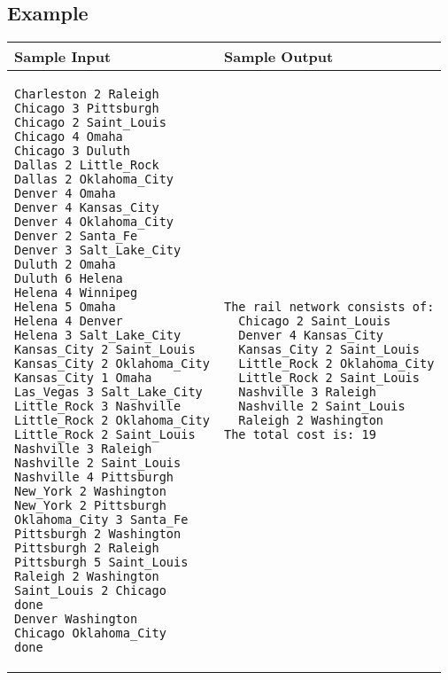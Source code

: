 \documentclass[12pt,pdftex]{article}
\begin{document}
\subsection*{Example}

\begin{tabular}{l|l}
{\bf Sample Input } & {\bf Sample Output} \\
\hline
\begin{minipage}[t]{0.5\linewidth}
\vspace*{0.5ex}
\begin{verbatim}
Charleston 2 Raleigh
Chicago 3 Pittsburgh
Chicago 2 Saint_Louis
Chicago 4 Omaha
Chicago 3 Duluth
Dallas 2 Little_Rock
Dallas 2 Oklahoma_City
Denver 4 Omaha
Denver 4 Kansas_City
Denver 4 Oklahoma_City
Denver 2 Santa_Fe
Denver 3 Salt_Lake_City
Duluth 2 Omaha
Duluth 6 Helena
Helena 4 Winnipeg
Helena 5 Omaha
Helena 4 Denver
Helena 3 Salt_Lake_City
Kansas_City 2 Saint_Louis
Kansas_City 2 Oklahoma_City
Kansas_City 1 Omaha
Las_Vegas 3 Salt_Lake_City
Little_Rock 3 Nashville
Little_Rock 2 Oklahoma_City
Little_Rock 2 Saint_Louis
Nashville 3 Raleigh
Nashville 2 Saint_Louis
Nashville 4 Pittsburgh
New_York 2 Washington
New_York 2 Pittsburgh
Oklahoma_City 3 Santa_Fe
Pittsburgh 2 Washington
Pittsburgh 2 Raleigh
Pittsburgh 5 Saint_Louis
Raleigh 2 Washington
Saint_Louis 2 Chicago
done
Denver Washington
Chicago Oklahoma_City
done
\end{verbatim}
\vspace*{0.5ex}
\end{minipage} &
\begin{minipage}[t]{0.4\linewidth}
\vspace*{0.5ex}
\begin{verbatim}
The rail network consists of:
  Chicago 2 Saint_Louis
  Denver 4 Kansas_City
  Kansas_City 2 Saint_Louis
  Little_Rock 2 Oklahoma_City
  Little_Rock 2 Saint_Louis
  Nashville 3 Raleigh
  Nashville 2 Saint_Louis
  Raleigh 2 Washington
The total cost is: 19
\end{verbatim}
\end{minipage} \\
\end{tabular}
\end{document}
